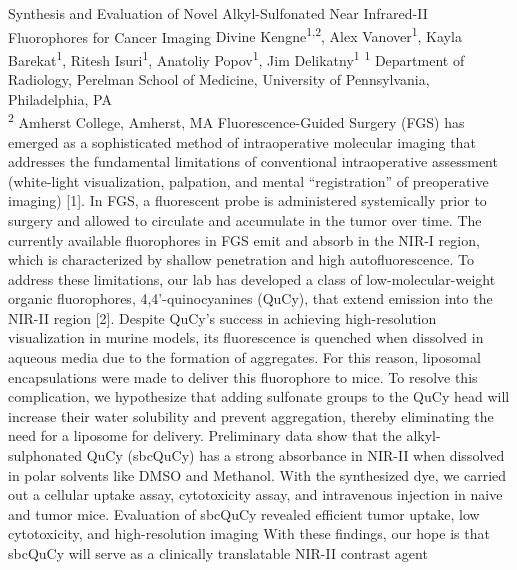 \makeabstract
    {
    Synthesis and Evaluation of Novel Alkyl-Sulfonated Near Infrared-II Fluorophores for Cancer Imaging
    }
    {
    Divine Kengne\textsuperscript{1,2}, Alex Vanover\textsuperscript{1}, Kayla Barekat\textsuperscript{1}, Ritesh Isuri\textsuperscript{1},  Anatoliy Popov\textsuperscript{1}, Jim Delikatny\textsuperscript{1}
    }
    {
    \textsuperscript{1} Department of Radiology, Perelman School of Medicine, University of Pennsylvania, Philadelphia, PA\\
\textsuperscript{2} Amherst College, Amherst, MA
    }
    {
    Fluorescence-Guided Surgery (FGS) has emerged as a sophisticated method of intraoperative molecular imaging that addresses the fundamental limitations of conventional intraoperative assessment (white-light visualization, palpation, and mental {\textquotedblleft}registration{\textquotedblright} of preoperative imaging) [1]. In FGS, a fluorescent probe is administered systemically prior to surgery and allowed to circulate and accumulate in the tumor over time.  The currently available fluorophores in FGS emit and absorb in the NIR-I region, which is characterized by shallow penetration and high autofluorescence. To address these limitations, our lab has developed a class of low-molecular-weight organic fluorophores, 4,4'-quinocyanines (QuCy), that extend emission into the NIR-II region [2]. Despite QuCy's success in achieving high-resolution visualization in murine models, its fluorescence is quenched when dissolved in aqueous media due to the formation of aggregates. For this reason, liposomal encapsulations were made to deliver this fluorophore to mice. To resolve this complication, we hypothesize that adding sulfonate groups to the QuCy head will increase their water solubility and prevent aggregation, thereby eliminating the need for a liposome for delivery. Preliminary data show that the alkyl-sulphonated QuCy (sbcQuCy) has a strong absorbance in NIR-II when dissolved in polar solvents like DMSO and Methanol. 
    }
    {
    With the synthesized dye, we carried out a cellular uptake assay, cytotoxicity assay, and intravenous injection in naive and tumor mice.
    }
    {
    Evaluation of sbcQuCy revealed efficient tumor uptake, low cytotoxicity, and high-resolution imaging
    }
    {
    With these findings, our hope is that sbcQuCy will serve as a clinically translatable NIR-II contrast agent
    }

    \newpage
    